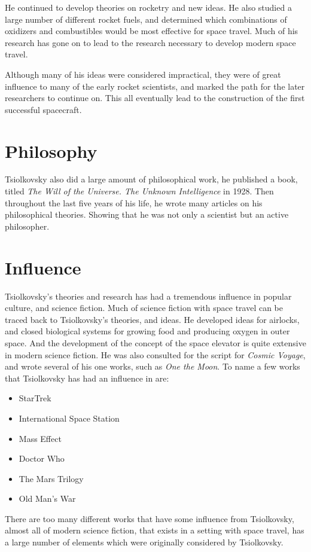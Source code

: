 \documentclass[10pt]{armath}
\begin{document}
He continued to develop theories on rocketry and new ideas. He also studied a
large number of different rocket fuels, and determined which combinations of
oxidizers and combustibles would be most effective for space travel. Much of
his research has gone on to lead to the research necessary to develop modern
space travel.

Although many of his ideas were considered impractical, they were of great
influence to many of the early rocket scientists, and marked the path for the
later researchers to continue on. This all eventually lead to the construction
of the first successful spacecraft.

\section{Philosophy}%
\label{sec:philosophy}

Tsiolkovsky also did a large amount of philosophical work, he published a book,
titled \textit{The Will of the Universe. The Unknown Intelligence} in 1928.
Then throughout the last five years of his life, he wrote many articles on his
philosophical theories. Showing that he was not only a scientist but an active
philosopher.

\section{Influence}%
\label{sec:influence}

Tsiolkovsky's theories and research has had a tremendous influence in popular
culture, and science fiction. Much of science fiction with space travel can be
traced back to Tsiolkovsky's theories, and ideas. He developed ideas for
airlocks, and closed biological systems for growing food and producing oxygen
in outer space. And the development of the concept of the space elevator is
quite extensive in modern science fiction. He was also consulted for the script
for \textit{Cosmic Voyage}, and wrote several of his one works, such as
\textit{One the Moon}. To name a few works that Tsiolkovsky has had an
influence in are:
\begin{itemize}
  \item StarTrek
  \item International Space Station
  \item Mass Effect
  \item Doctor Who
  \item The Mars Trilogy
  \item Old Man's War
\end{itemize}
There are too many different works that have some influence from Tsiolkovsky,
almost all of modern science fiction, that exists in a setting with space
travel, has a large number of elements which were originally considered by
Tsiolkovsky.
\end{document}
